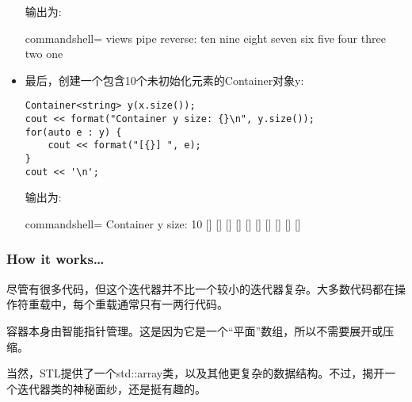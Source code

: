 \begin{itemize}
输出为:

\begin{tcblisting}{commandshell={}}
views pipe reverse:
ten nine eight seven six five four three two one
\end{tcblisting}

\item 
最后，创建一个包含10个未初始化元素的Container对象y:

\begin{lstlisting}[style=styleCXX]
Container<string> y(x.size());
cout << format("Container y size: {}\n", y.size());
for(auto e : y) {
	cout << format("[{}] ", e);
}
cout << '\n';
\end{lstlisting}

输出为:

\begin{tcblisting}{commandshell={}}
Container y size: 10
[] [] [] [] [] [] [] [] [] []
\end{tcblisting}

\end{itemize}

\subsubsection{How it works…}

尽管有很多代码，但这个迭代器并不比一个较小的迭代器复杂。大多数代码都在操作符重载中，每个重载通常只有一两行代码。

容器本身由智能指针管理。这是因为它是一个“平面”数组，所以不需要展开或压缩。

当然，STL提供了一个std::array类，以及其他更复杂的数据结构。不过，揭开一个迭代器类的神秘面纱，还是挺有趣的。

